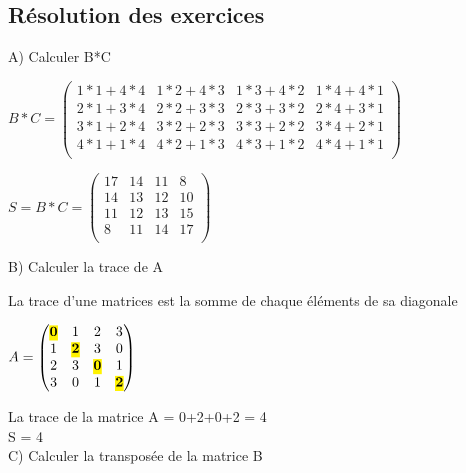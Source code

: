 \newpage

\subsection{Résolution des exercices}
\vspace{5mm} %
A) Calculer B*C
\vspace{10mm} %

$
B*C =
\begin{pmatrix}
  1*1+4*4 & 1*2+4*3 & 1*3+4*2 & 1*4+4*1 \\
  2*1+3*4 & 2*2+3*3 & 2*3+3*2 & 2*4+3*1 \\
  3*1+2*4 & 3*2+2*3 & 3*3+2*2 & 3*4+2*1 \\
  4*1+1*4 & 4*2+1*3 & 4*3+1*2 & 4*4+1*1 \\
\end{pmatrix}
$

\vspace{5mm} %

$
S = B*C =
\begin{pmatrix}
  17 & 14 & 11 & 8 \\
  14 & 13 & 12 & 10 \\
  11 & 12 & 13 & 15 \\
  8 & 11 & 14 & 17 \\
\end{pmatrix}
$

\vspace{10mm} %
B) Calculer la trace de A
\vspace{5mm} %

La trace d'une matrices est la somme de chaque éléments de sa diagonale
\vspace{5mm} %

$
A =
\begin{pmatrix}
  \hl{\textbf{0}}  & 1 & 2 & 3 \\
  1 & \hl{\textbf{2}} & 3 & 0 \\
  2 & 3 & \hl{\textbf{0}} & 1 \\
  3 & 0 & 1 & \hl{\textbf{2}} \\
\end{pmatrix}
$
\vspace{3mm} %

La trace de la matrice A = 0+2+0+2 = 4 \\
S = 4 \\

\vspace{10mm} %
C) Calculer la transposée de la matrice B

